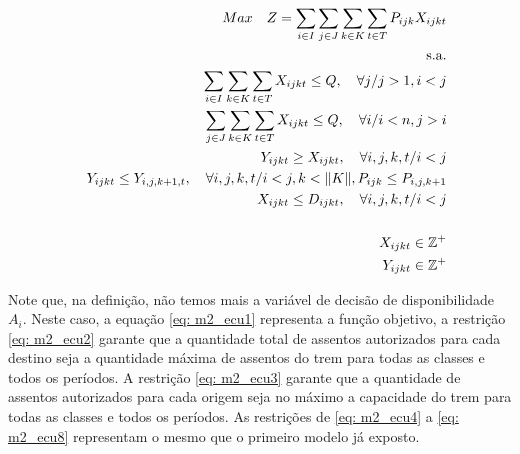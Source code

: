 \renewcommand{\baselinestretch}{0.5}

\begin{eqnarray}
	&& Max \quad Z = \sum_{i\in I} \sum_{j\in J} \sum_{k\in K} \sum_{t\in T} P_{ijk} X_{ijkt}                                             \label{eq: m2_ecu1}   \\
	&& \text{s.a.}  \notag                                                                                                                               \\
	&& \sum_{i\in I}\sum_{k\in K}\sum_{t\in T}X_{ijkt} \leq Q , \quad \forall j / j>1, i<j                                                \label{eq: m2_ecu2}   \\
	&& \sum_{j\in J}\sum_{k\in K}\sum_{t\in T}X_{ijkt} \leq Q , \quad \forall i / i<n, j>i                                                \label{eq: m2_ecu3}   \\
	&& Y_{ijkt} \geq X_{ijkt},  \quad \forall i,j,k,t/ i < j                                                                              \label{eq: m2_ecu4}   \\
	&& Y_{ijkt} \leq Y_{i,j,k+1,t},  \quad \forall i,j,k,t / i < j, k < \lVert K \rVert,  P_{ijk} \leq P_{i,j,k+1}                        \label{eq: m2_ecu5}   \\
	&& X_{ijkt} \leq D_{ijkt},  \quad \forall i,j,k,t/ i < j                                                                              \label{eq: m2_ecu6}   \\[15pt]
	&& X_{ijkt} \in \mathbb{Z}^+                                                                                                           \label{eq: m2_ecu7} \\
	&& Y_{ijkt} \in \mathbb{Z}^+                                                                                                           \label{eq: m2_ecu8}
\end{eqnarray}

Note que, na definição, não temos mais a variável de decisão de disponibilidade \(A_i\). Neste caso, a equação \ref{eq: m2_ecu1} representa a função objetivo, a restrição \ref{eq: m2_ecu2} garante que a quantidade total de assentos autorizados para cada destino seja a quantidade máxima de assentos do trem para todas as classes e todos os períodos. A restrição \ref{eq: m2_ecu3} garante que a quantidade de assentos autorizados para cada origem seja no máximo a capacidade do trem para todas as classes e todos os períodos. As restrições de \ref{eq: m2_ecu4} a \ref{eq: m2_ecu8} representam o mesmo que o primeiro modelo já exposto.